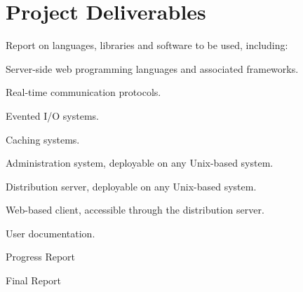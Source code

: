 \documentclass[a4papert,11pt,notitlepage]{ltxdoc}
\begin{document}
\section{Project Deliverables}
\begin{itemize*}
\item Report on languages, libraries and software to be used, including:
\begin{itemize*}
\item Server-side web programming languages and associated frameworks.
\item Real-time communication protocols.
\item Evented I/O systems.
\item Caching systems.
\end{itemize*}
\item Administration system, deployable on any Unix-based system.
\item Distribution server, deployable on any Unix-based system.
\item Web-based client, accessible through the distribution server.
\item User documentation.
\item Progress Report
\item Final Report
\end{itemize*}

\renewcommand{\refname}{Initial Bibliography}

\end{document}
